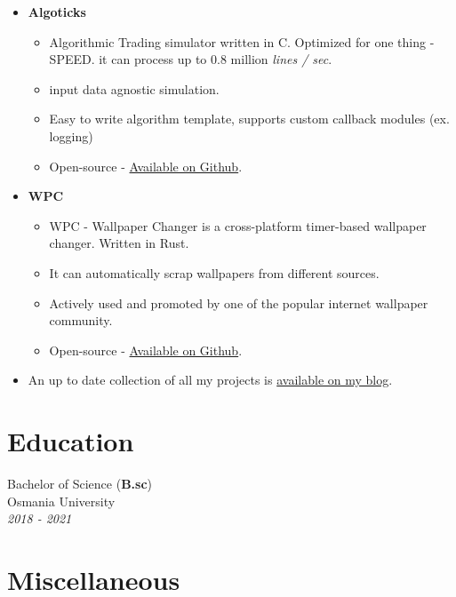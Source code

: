 \documentclass{article}
\begin{document}
\begin{itemize}
    \item \textbf{Algoticks}
    \subitem
    \begin{itemize}
        \vspace{-0.25cm}
        \item Algorithmic Trading simulator written in C. Optimized for one thing - SPEED. it can process up to 0.8 million \textit{lines / sec}.
        \item input data agnostic simulation.
        \item Easy to write algorithm template, supports custom callback modules (ex. logging)
        \item Open-source - \href{https://github.com/jkotra/algoticks/}{Available on Github}.
        \vspace{0.35cm}
    \end{itemize}
    
    \pagebreak
    
    \item \textbf{WPC}
    \subitem
    \begin{itemize}
        \vspace{-0.25cm}
        \item WPC - Wallpaper Changer is a cross-platform timer-based wallpaper changer. Written in Rust.
        \item It can automatically scrap wallpapers from different sources.
        \item Actively used and promoted by one of the popular internet wallpaper community.
        \item Open-source - \href{https://github.com/jkotra/wpc/}{Available on Github}.
        \vspace{0.35cm}
    \end{itemize}
    
    \item An up to date collection of all my projects is \href{https://stdin.top/portfolio/}{available on my blog}.                  
\end{itemize}

\section{Education}
Bachelor of Science (\textbf{B.sc}) \\
Osmania University \\
\emph{2018 - 2021}



\section{Miscellaneous}
\end{document}

